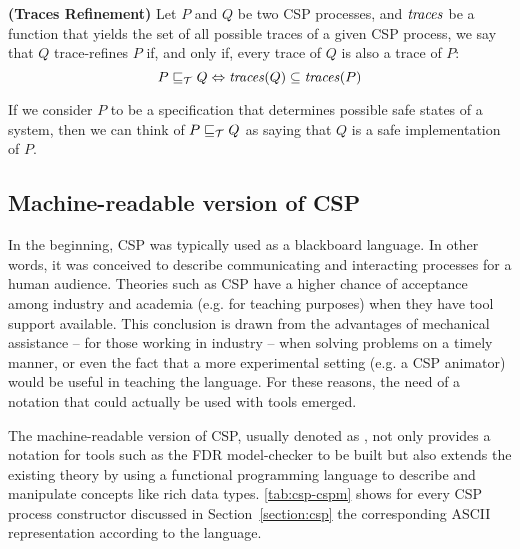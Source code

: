 \begin{definition}{\textbf{(Traces Refinement)}}
	Let $ P $ and $ Q $ be two CSP processes, and $ \mathit{\traces} $ be a function that yields the set of all possible traces of a given CSP process, we say that $ Q $ trace-refines $ P $ if, and only if, every trace of $ Q $ is also a trace of $ P $:
	\[  P \refinedby[\tmodel] Q \iff \mathit{\traces}(Q) \subseteq \mathit{\traces}(P) \]
\end{definition}

If we consider $ P $ to be a specification that determines possible safe states of a system, then we can think of $ P \refinedby[\tmodel] Q $ as saying that $ Q $ is a safe implementation of $P$.

\subsection{Machine-readable version of CSP}

In the beginning, CSP was typically used as a blackboard language. In other words, it was conceived to describe communicating and interacting processes for a human audience. Theories such as CSP have a higher chance of acceptance among industry and academia (e.g. for teaching purposes) when they have tool support available. This conclusion is drawn from the advantages of mechanical assistance -- for those working in industry -- when solving problems on a timely manner, or even the fact that a more experimental setting (e.g. a CSP animator) would be useful in teaching the language. For these reasons, the need of a notation that could actually be used with tools emerged.

The machine-readable version of CSP, usually denoted as \CSPM{}, not only provides a notation for tools such as the FDR model-checker to be built but also extends the existing theory by using a functional programming language to describe and manipulate concepts like rich data types. \autoref{tab:csp-cspm} shows for every CSP process constructor discussed in Section~\ref{section:csp} the corresponding ASCII representation according to the \CSPM{} language.

